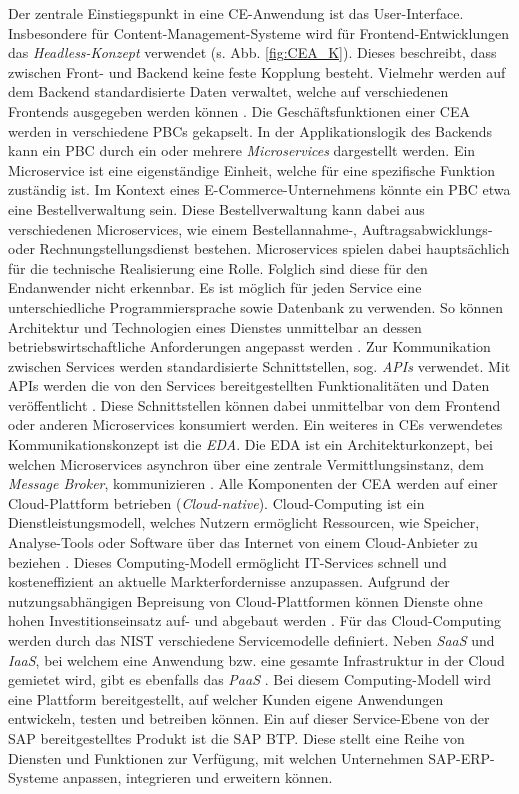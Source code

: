 Der zentrale Einstiegspunkt in eine CE-Anwendung ist das User-Interface. Insbesondere für Content-Management-Systeme wird für Frontend-Entwicklungen das \textit{Headless-Konzept} verwendet (s. Abb. \ref{fig:CEA_K}). Dieses beschreibt, dass zwischen Front- und Backend keine feste Kopplung besteht. Vielmehr werden auf dem Backend standardisierte Daten verwaltet, welche auf verschiedenen Frontends ausgegeben werden können \cite{.20230313}. Die Geschäftsfunktionen einer CEA werden in verschiedene PBCs gekapselt. In der Applikationslogik des Backends kann ein PBC durch ein oder mehrere \textit{Microservices} dargestellt werden. Ein Microservice ist eine eigenständige Einheit, welche für eine spezifische Funktion zuständig ist. Im Kontext eines E-Commerce-Unternehmens könnte ein PBC etwa eine Bestellverwaltung sein. Diese Bestellverwaltung kann dabei aus verschiedenen Microservices, wie einem Bestellannahme-, Auftragsabwicklungs- oder Rechnungstellungsdienst bestehen. Microservices spielen dabei hauptsächlich für die technische Realisierung eine Rolle. Folglich sind diese für den Endanwender nicht erkennbar. Es ist möglich für jeden Service eine unterschiedliche Programmiersprache sowie Datenbank zu verwenden. So können Architektur und Technologien eines Dienstes unmittelbar an dessen betriebswirtschaftliche Anforderungen angepasst werden \cite[41]{.2009}. Zur Kommunikation zwischen Services werden standardisierte Schnittstellen, sog. \textit{\ac*{APIs}} verwendet. Mit APIs werden die von den Services bereitgestellten Funktionalitäten und Daten veröffentlicht \cite[15]{Biehl.2015}. Diese Schnittstellen können dabei unmittelbar von dem Frontend oder anderen Microservices konsumiert werden. Ein weiteres in CEs verwendetes Kommunikationskonzept ist die \textit{\ac{EDA}}. Die EDA ist ein Architekturkonzept, bei welchen Microservices asynchron über eine zentrale Vermittlungsinstanz, dem \textit{Message Broker}, kommunizieren \cite[54]{Bruns.2010}. Alle Komponenten der CEA werden auf einer Cloud-Plattform betrieben (\textit{Cloud-native}). Cloud-Computing ist ein Dienstleistungsmodell, welches Nutzern ermöglicht Ressourcen, wie Speicher, Analyse-Tools oder Software über das Internet von einem Cloud-Anbieter zu beziehen \cite[5]{Reinheimer.2018}. Dieses Computing-Modell ermöglicht IT-Services schnell und kosteneffizient an aktuelle Markterfordernisse anzupassen. Aufgrund der nutzungsabhängigen Bepreisung von Cloud-Plattformen können Dienste ohne hohen Investitionseinsatz auf- und abgebaut werden \cite[10]{Reinheimer.2018}. Für das Cloud-Computing werden durch das \ac{NIST} verschiedene Servicemodelle definiert. Neben \textit{\ac{SaaS}} und \textit{\ac{IaaS}}, bei welchem  eine Anwendung bzw. eine gesamte Infrastruktur in der Cloud gemietet wird, gibt es ebenfalls das \textit{\ac{PaaS}} \cite{Reinheimer.2018} \cite[9]{Reinheimer.2018}. Bei diesem Computing-Modell wird eine Plattform bereitgestellt, auf welcher Kunden eigene Anwendungen entwickeln, testen und betreiben können. Ein auf dieser Service-Ebene von der SAP bereitgestelltes Produkt ist die \ac{SAP BTP}. Diese stellt eine Reihe von Diensten und Funktionen zur Verfügung, mit welchen Unternehmen SAP-ERP-Systeme anpassen, integrieren und erweitern können. 

